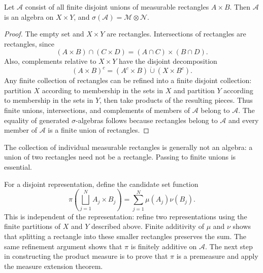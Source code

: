 \begin{proposition}\label{prop:rectangle-algebra-oct-06}
  Let $\mathcal A$ consist of all finite disjoint unions of
  measurable rectangles $A\times B$. Then $\mathcal A$ is an
  algebra on $X\times Y$, and
  $\sigma(\mathcal A)=\mathcal M\otimes\mathcal N$.
\end{proposition}

\begin{proof}
  The empty set and $X\times Y$ are rectangles. Intersections of
  rectangles are rectangles, since
  \[
    (A\times B)\cap(C\times D)=(A\cap C)\times(B\cap D).
  \]
  Also, complements relative to $X\times Y$ have the disjoint
  decomposition
  \[
    (A\times B)^c=(A^c\times B)\mathbin{\dot\cup}(X\times B^c).
  \]
  Any finite collection of rectangles can be refined into a finite
  disjoint collection: partition $X$ according to membership in
  the sets in $X$ and partition $Y$ according to membership in
  the sets in $Y$, then take products
  of the resulting pieces. Thus finite unions, intersections, and
  complements of members of $\mathcal A$ belong to $\mathcal A$.
  The equality of generated $\sigma$-algebras follows because
  rectangles belong to $\mathcal A$ and every member of
  $\mathcal A$ is a finite union of rectangles.
\end{proof}

\begin{remark}
  The collection of individual measurable rectangles is generally
  not an algebra: a union of two rectangles need not be a rectangle.
  Passing to finite unions is essential.
\end{remark}

For a disjoint representation, define the candidate set function
\[
  \pi\left(\bigsqcup_{j=1}^N A_j\times B_j\right)
    =\sum_{j=1}^N\mu(A_j)\nu(B_j).
\]
This is independent of the representation: refine two representations
using the finite partitions of $X$ and $Y$ described above. Finite
additivity of $\mu$ and $\nu$ shows that splitting a rectangle into
these smaller rectangles preserves the sum. The same refinement
argument shows that $\pi$ is finitely additive on $\mathcal A$.
The next step in constructing the product measure is to prove that
$\pi$ is a premeasure and apply the measure extension theorem.

\FloatBarrier
